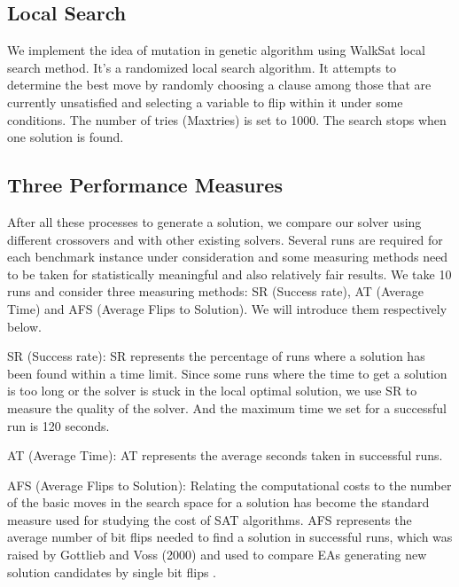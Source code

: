 \subsection{Local Search}
We implement the idea of mutation in genetic algorithm using WalkSat local search method. It's a randomized local search algorithm. It attempts to determine the best move by randomly choosing a clause among those that are currently unsatisfied and selecting a variable to flip within it under some conditions. The number of tries (Maxtries) is set to 1000. The search stops when one solution is found.

\subsection{Three Performance Measures}
After all these processes to generate a solution, we compare our solver using different crossovers and with other existing solvers. Several runs are required for each benchmark instance under consideration and some measuring methods need to be taken for statistically meaningful and also relatively fair results. We take 10 runs and consider three measuring methods: SR (Success rate), AT (Average Time) and AFS (Average Flips to Solution). We will introduce them respectively below.

SR (Success rate):
SR represents the percentage of runs where a solution has been found within a time limit. Since some runs where the time to get a solution is too long or the solver is stuck in the local optimal solution, we use SR to measure the quality of the solver. And the maximum time we set for a successful run is 120 seconds.

AT (Average Time):
AT represents the average seconds taken in successful runs.

AFS (Average Flips to Solution):
Relating the computational costs to the number of the basic moves in the search space for a solution has become the standard measure used for studying the cost of SAT algorithms\parencite{Singer2000}. AFS represents the average number of bit flips needed to find a solution in successful runs, which was raised by Gottlieb and Voss (2000) and used to compare EAs generating new solution candidates by single bit flips \parencite{Voss}. 